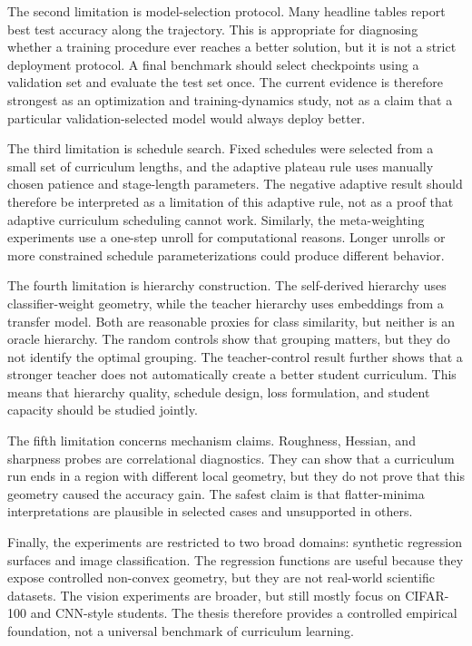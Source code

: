 \documentclass[english,master,a4paper,oneside]{ppfcmthesis}
\begin{document}
The second limitation is model-selection protocol. Many headline tables report
best test accuracy along the trajectory. This is appropriate for diagnosing
whether a training procedure ever reaches a better solution, but it is not a
strict deployment protocol. A final benchmark should select checkpoints using a
validation set and evaluate the test set once. The current evidence is therefore
strongest as an optimization and training-dynamics study, not as a claim that a
particular validation-selected model would always deploy better.

The third limitation is schedule search. Fixed schedules were selected from a
small set of curriculum lengths, and the adaptive plateau rule uses manually
chosen patience and stage-length parameters. The negative adaptive result should
therefore be interpreted as a limitation of this adaptive rule, not as a proof
that adaptive curriculum scheduling cannot work. Similarly, the meta-weighting
experiments use a one-step unroll for computational reasons. Longer unrolls or
more constrained schedule parameterizations could produce different behavior.

The fourth limitation is hierarchy construction. The self-derived hierarchy uses
classifier-weight geometry, while the teacher hierarchy uses embeddings from a
transfer model. Both are reasonable proxies for class similarity, but neither is
an oracle hierarchy. The random controls show that grouping matters, but they do
not identify the optimal grouping. The teacher-control result further shows that
a stronger teacher does not automatically create a better student curriculum.
This means that hierarchy quality, schedule design, loss formulation, and
student capacity should be studied jointly.

The fifth limitation concerns mechanism claims. Roughness, Hessian, and
sharpness probes are correlational diagnostics. They can show that a curriculum
run ends in a region with different local geometry, but they do not prove that
this geometry caused the accuracy gain. The safest claim is that flatter-minima
interpretations are plausible in selected cases and unsupported in others.

Finally, the experiments are restricted to two broad domains: synthetic
regression surfaces and image classification. The regression functions are useful
because they expose controlled non-convex geometry, but they are not real-world
scientific datasets. The vision experiments are broader, but still mostly focus
on CIFAR-100 and CNN-style students. The thesis therefore provides a controlled
empirical foundation, not a universal benchmark of curriculum learning.
\end{document}
